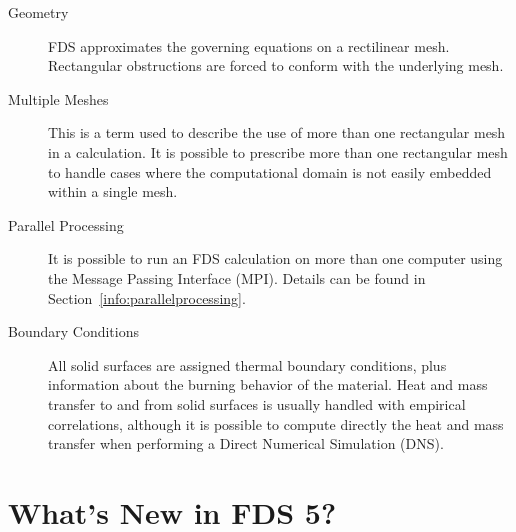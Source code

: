 \documentclass[11pt]{book}
\begin{document}
\begin{description}
\item[Geometry]
FDS approximates the governing equations on a rectilinear mesh.
Rectangular obstructions are forced to conform with the underlying mesh.

\item[Multiple Meshes] This is a term used to describe the use of
more than one rectangular mesh in a calculation. It is possible to prescribe
more than one rectangular mesh to handle cases where the computational
domain is not easily embedded within a single mesh.

\item[Parallel Processing] It is possible to run an FDS calculation on
more than one computer using the Message Passing Interface (MPI). Details
can be found in Section~\ref{info:parallelprocessing}.

\item[Boundary Conditions]
All solid surfaces are assigned thermal boundary conditions, plus
information about the burning behavior of the material.
Heat and mass transfer to and from solid surfaces is
usually handled with empirical correlations, although it is possible
to compute directly the heat and mass transfer when performing a
Direct Numerical Simulation (DNS).

\end{description}


\section{What's New in FDS 5?}
\end{document}
